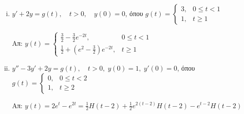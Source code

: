 \begin{enumerate}
      \begin{enumerate}[i)]
        \item $y'+2y=g(t),\quad t>0,\quad y(0)=0$, όπου $g(t)=\begin{cases}3, & 
          0\leq t<1 \\ 1, & t\geq 1\end{cases}$

          \hfill Απ: $y(t)=\begin{cases} \frac{3}{2}-\frac{3}{2}e^{-2t},& 0\leq t<1 \\ 
          \frac{1}{2}+\left(e^2-\frac{3}{2}\right)e^{-2t}, & t\geq 1\end{cases}$

        \item $y''-3y'+2y=g(t),\quad t>0,\; y(0)=1,\; y'(0)=0$, όπου 
          $g(t)=\begin{cases} 0, & 0\leq t<2 \\ 1, & t\geq 2\end{cases}$

          \hfill Απ: $y(t)=2e^t-e^{2t}=\frac{1}{2}H(t-2)+\frac{1}{2}e^{2(t-2)}
          H(t-2)-e^{t-2}H(t-2)$
      \end{enumerate}


\end{enumerate}
